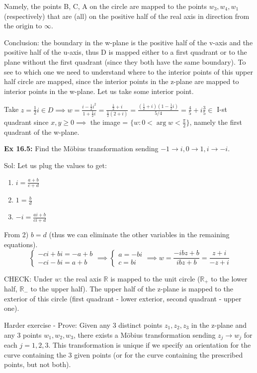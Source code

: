 \documentclass{article}
\begin{document}
Namely, the points B, C, A on the circle are mapped to the points $w_3, w_4, w_1$ (respectively) that are (all) on the positive half of the real axis in direction from the origin to $\infty$.

Conclusion: the boundary in the w-plane is the positive half of the v-axis and the positive half of the u-axis, thus D is mapped either to a first quadrant or to the plane
without the first quadrant (since they both have the same boundary). To see to which one we need to understand where to the interior points of this upper half circle are mapped, since the interior points in the z-plane are mapped to interior points in the w-plane. Let us take some interior point.

Take $z = \frac{1}{2}i \in D \implies w = \frac{i - \frac{1}{2}i^2}{1 + \frac{1}{2}i} = \frac{\frac{1}{2} + i}{\frac{1}{2}(2+i)} = \frac{(\frac{1}{2} + i)(1 - \frac{1}{2}i)}{5/4} = \frac{4}{5} + i\frac{3}{5} \in$ I-st quadrant since $x, y \geq 0 \implies$ the image = $\{w: 0 < \arg w < \frac{\pi}{2}\}$, namely the first quadrant of the w-plane.

\textbf{Ex 16.5:} Find the Möbius transformation sending $-1 \to i, 0 \to 1, i \to -i$.

Sol: Let us plug the values to get:
\begin{enumerate}
    \item $i = \frac{a+b}{c+d}$
    \item $1 = \frac{b}{d}$
    \item $-i = \frac{ai+b}{ci+d}$
\end{enumerate}

From 2) $b = d$ (thus we can eliminate the other variables in the remaining equations).
$$ \begin{cases}
-ci + bi = -a + b \\
-ci - bi = a + b
\end{cases}
\implies
\begin{cases}
a = -bi \\
c = bi
\end{cases}
\implies w = \frac{-ibz + b}{ibz + b} = \frac{z+i}{-z+i} $$

CHECK: Under $w$: the real axis $\mathbb{R}$ is mapped to the unit circle ($\mathbb{R}_+$ to the lower half, $\mathbb{R}_-$ to the upper half). The upper half of the z-plane is mapped to the exterior of this circle (first quadrant - lower exterior, second quadrant - upper one).

Harder exercise - Prove: Given any 3 distinct points $z_1, z_2, z_3$ in the z-plane and any 3 points $w_1, w_2, w_3$, there exists a Möbius transformation sending $z_j \to w_j$ for each $j = 1, 2, 3$. This transformation is unique if we specify an orientation for the curve containing the 3 given points (or for the curve containing the prescribed points, but not both).
\end{document}
